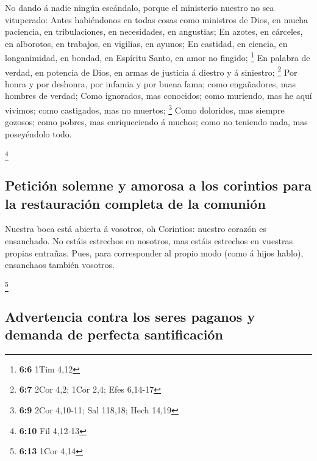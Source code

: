  No dando á nadie ningún escándalo, porque el ministerio
nuestro no sea vituperado:  Antes habiéndonos en todas
cosas como ministros de Dios, en mucha paciencia, en tribulaciones, en
necesidades, en angustias;  En azotes, en cárceles, en
alborotos, en trabajos, en vigilias, en ayunos;  En
castidad, en ciencia, en longanimidad, en bondad, en Espíritu Santo, en
amor no fingido; \footnote{\textbf{6:6} 1Tim 4,12}  En
palabra de verdad, en potencia de Dios, en armas de justicia á diestro y
á siniestro; \footnote{\textbf{6:7} 2Cor 4,2; 1Cor 2,4; Efes 6,14-17}
 Por honra y por deshonra, por infamia y por buena fama;
como engañadores, mas hombres de verdad;  Como ignorados,
mas conocidos; como muriendo, mas he aquí vivimos; como castigados, mas
no muertos; \footnote{\textbf{6:9} 2Cor 4,10-11; Sal 118,18; Hech 14,19}
 Como doloridos, mas siempre gozosos; como pobres, mas
enriqueciendo á muchos; como no teniendo nada, mas poseyéndolo todo.

\footnote{\textbf{6:10} Fil 4,12-13}

\hypertarget{peticiuxf3n-solemne-y-amorosa-a-los-corintios-para-la-restauraciuxf3n-completa-de-la-comuniuxf3n}{%
\subsection{Petición solemne y amorosa a los corintios para la
restauración completa de la
comunión}\label{peticiuxf3n-solemne-y-amorosa-a-los-corintios-para-la-restauraciuxf3n-completa-de-la-comuniuxf3n}}

 Nuestra boca está abierta á vosotros, oh Corintios:
nuestro corazón es ensanchado.  No estáis estrechos en
nosotros, mas estáis estrechos en vuestras propias entrañas.
 Pues, para corresponder al propio modo (como á hijos
hablo), ensanchaos también vosotros.

\footnote{\textbf{6:13} 1Cor 4,14}

\hypertarget{advertencia-contra-los-seres-paganos-y-demanda-de-perfecta-santificaciuxf3n}{%
\subsection{Advertencia contra los seres paganos y demanda de perfecta
santificación}\label{advertencia-contra-los-seres-paganos-y-demanda-de-perfecta-santificaciuxf3n}}

